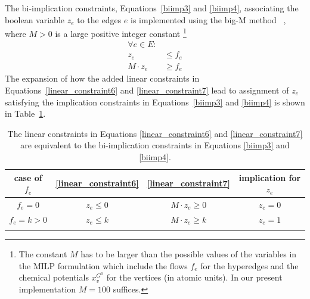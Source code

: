 The bi-implication constraints, Equations~\eqref{biimp3} and \eqref{biimp4}, associating the boolean variable $z_e$ to the edges $e$ is implemented using the big-M method ~\cite{bigM},
where $M > 0$ is a large positive integer constant%
\footnote{The constant $M$ has to be larger than the possible values of the variables in the MILP formulation which include the flows $f_e$ for the hyperedges and the chemical potentials $x^{G^0}_v$ for the vertices (in atomic units). In our present implementation $M = 100$ suffices.}
\begin{align}
    \forall e \in E\colon & \nonumber \\
    z_e &\leq f_e \label{linear_constraint6}\\
    M\cdot z_e &\geq f_e \label{linear_constraint7}
\end{align}
The expansion of how the added linear constraints in Equations~\eqref{linear_constraint6} and \eqref{linear_constraint7}
lead to assignment of $z_e$ satisfying the implication constraints in Equations~\eqref{biimp3} and \eqref{biimp4}
is shown in Table~\ref{tab: truth_table_constraint1}.
\begin{table}[!t]
    \centering
    \begin{footnotesize}
    \begin{tabular}{cccc}
        \\\toprule
        case of $f_e$ & \eqref{linear_constraint6} & \eqref{linear_constraint7} & implication for $z_e$ \\
        \midrule
        $f_e = 0$ & $z_e \leq 0$ & $M\cdot z_e \geq 0$ & $z_e = 0$ \\
        $f_e = k > 0$ & $z_e \leq k$ & $M\cdot z_e \geq k$ & $z_e = 1$ \\
        \bottomrule\\
    \end{tabular}
    \end{footnotesize}
    \caption{The linear constraints in Equations \eqref{linear_constraint6} and \eqref{linear_constraint7}
    are equivalent to the bi-implication constraints in Equations \eqref{biimp3} and \eqref{biimp4}.}
    \label{tab: truth_table_constraint1}
\end{table}

